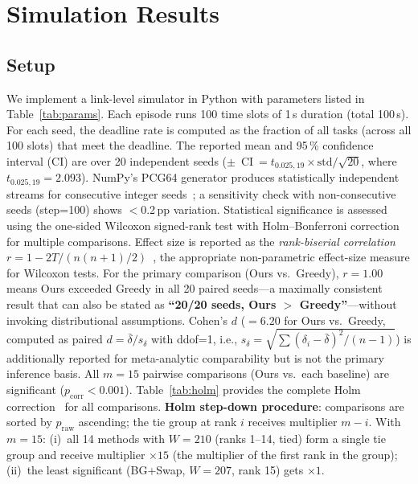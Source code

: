 \documentclass[journal]{IEEEtran}
\begin{document}
\section{Simulation Results}
\label{sec:results}

\subsection{Setup}

We implement a link-level simulator in Python with parameters listed in Table~\ref{tab:params}.
Each episode runs 100 time slots of 1\,s duration (total 100\,s).
For each seed, the deadline rate is computed as the fraction of all tasks (across all 100 slots) that meet the deadline.
The reported mean and 95\,\% confidence interval (CI) are over 20 independent seeds ($\pm$~CI$~= t_{0.025,19}\!\times\!\text{std}/\!\sqrt{20}$, where $t_{0.025,19}\!=\!2.093$).
NumPy's PCG64 generator produces statistically independent streams for consecutive integer seeds~\cite{blackman2021scrambled}; a sensitivity check with non-consecutive seeds (step=100) shows $<$0.2\,pp variation.
Statistical significance is assessed using the one-sided Wilcoxon signed-rank test with Holm--Bonferroni correction for multiple comparisons.
Effect size is reported as the \emph{rank-biserial correlation} $r = 1 - 2T/(n(n+1)/2)$~\cite{kerby2014simple}, the appropriate non-parametric effect-size measure for Wilcoxon tests.
For the primary comparison (Ours vs.\ Greedy), $r = 1.00$ means Ours exceeded Greedy in all 20 paired seeds---a maximally consistent result that can also be stated as \textbf{``20/20 seeds, Ours $>$ Greedy''}---without invoking distributional assumptions.
Cohen's $d$ ($= 6.20$ for Ours vs.\ Greedy, computed as paired $d = \bar{\delta}/s_\delta$ with ddof=1, i.e., $s_\delta = \sqrt{\sum(\delta_i - \bar\delta)^2/(n-1)}$) is additionally reported for meta-analytic comparability but is not the primary inference basis.
All $m\!=\!15$ pairwise comparisons (Ours vs.\ each baseline) are significant ($p_{\text{corr}}\!<\!0.001$).
Table~\ref{tab:holm} provides the complete Holm correction~\cite{holm1979simple} for all comparisons.
\textbf{Holm step-down procedure}: comparisons are sorted by $p_{\text{raw}}$ ascending; the tie group at rank $i$ receives multiplier $m\!-\!i$.
With $m\!=\!15$: (i)~all 14 methods with $W\!=\!210$ (ranks 1--14, tied) form a single tie group and receive multiplier $\times 15$ (the multiplier of the first rank in the group); (ii)~the least significant (BG+Swap, $W\!=\!207$, rank 15) gets $\times 1$.
\end{document}
